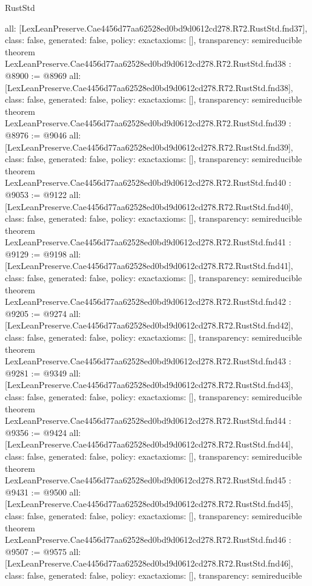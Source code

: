 \begin{lexlean}{RustStd}
\begin{coremodule}
{  all: [LexLeanPreserve.Cae4456d77aa62528ed0bd9d0612cd278.R72.RustStd.fnd37],
  class: false,
  generated: false,
  policy: exact{axioms: []},
  transparency: semireducible
}
theorem LexLeanPreserve.Cae4456d77aa62528ed0bd9d0612cd278.R72.RustStd.fnd38 : @8900 := @8969 {
  all: [LexLeanPreserve.Cae4456d77aa62528ed0bd9d0612cd278.R72.RustStd.fnd38],
  class: false,
  generated: false,
  policy: exact{axioms: []},
  transparency: semireducible
}
theorem LexLeanPreserve.Cae4456d77aa62528ed0bd9d0612cd278.R72.RustStd.fnd39 : @8976 := @9046 {
  all: [LexLeanPreserve.Cae4456d77aa62528ed0bd9d0612cd278.R72.RustStd.fnd39],
  class: false,
  generated: false,
  policy: exact{axioms: []},
  transparency: semireducible
}
theorem LexLeanPreserve.Cae4456d77aa62528ed0bd9d0612cd278.R72.RustStd.fnd40 : @9053 := @9122 {
  all: [LexLeanPreserve.Cae4456d77aa62528ed0bd9d0612cd278.R72.RustStd.fnd40],
  class: false,
  generated: false,
  policy: exact{axioms: []},
  transparency: semireducible
}
theorem LexLeanPreserve.Cae4456d77aa62528ed0bd9d0612cd278.R72.RustStd.fnd41 : @9129 := @9198 {
  all: [LexLeanPreserve.Cae4456d77aa62528ed0bd9d0612cd278.R72.RustStd.fnd41],
  class: false,
  generated: false,
  policy: exact{axioms: []},
  transparency: semireducible
}
theorem LexLeanPreserve.Cae4456d77aa62528ed0bd9d0612cd278.R72.RustStd.fnd42 : @9205 := @9274 {
  all: [LexLeanPreserve.Cae4456d77aa62528ed0bd9d0612cd278.R72.RustStd.fnd42],
  class: false,
  generated: false,
  policy: exact{axioms: []},
  transparency: semireducible
}
theorem LexLeanPreserve.Cae4456d77aa62528ed0bd9d0612cd278.R72.RustStd.fnd43 : @9281 := @9349 {
  all: [LexLeanPreserve.Cae4456d77aa62528ed0bd9d0612cd278.R72.RustStd.fnd43],
  class: false,
  generated: false,
  policy: exact{axioms: []},
  transparency: semireducible
}
theorem LexLeanPreserve.Cae4456d77aa62528ed0bd9d0612cd278.R72.RustStd.fnd44 : @9356 := @9424 {
  all: [LexLeanPreserve.Cae4456d77aa62528ed0bd9d0612cd278.R72.RustStd.fnd44],
  class: false,
  generated: false,
  policy: exact{axioms: []},
  transparency: semireducible
}
theorem LexLeanPreserve.Cae4456d77aa62528ed0bd9d0612cd278.R72.RustStd.fnd45 : @9431 := @9500 {
  all: [LexLeanPreserve.Cae4456d77aa62528ed0bd9d0612cd278.R72.RustStd.fnd45],
  class: false,
  generated: false,
  policy: exact{axioms: []},
  transparency: semireducible
}
theorem LexLeanPreserve.Cae4456d77aa62528ed0bd9d0612cd278.R72.RustStd.fnd46 : @9507 := @9575 {
  all: [LexLeanPreserve.Cae4456d77aa62528ed0bd9d0612cd278.R72.RustStd.fnd46],
  class: false,
  generated: false,
  policy: exact{axioms: []},
  transparency: semireducible
}
\end{coremodule}
\end{lexlean}
